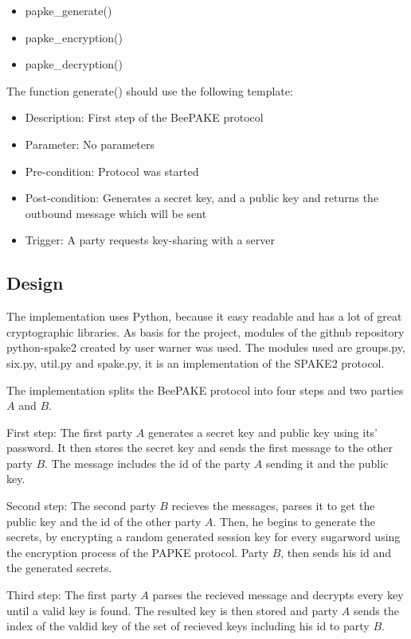 \documentclass[../main.tex]{subfiles}
\begin{document}
\begin{itemize}
	\item papke\_generate()
	\item papke\_encryption()
	\item papke\_decryption()
\end{itemize}

The function generate() should use the following template:
\begin{itemize}
	\item Description: First step of the BeePAKE protocol
	\item Parameter: No parameters
	\item Pre-condition: Protocol was started
	\item Post-condition: Generates a secret key, and a public key and returns the outbound message which will be sent
	\item Trigger: A party requests key-sharing with a server
\end{itemize}

\subsection{Design} 
The implementation uses Python, because it easy readable and has a lot of great
cryptographic libraries. As basis for the project, modules of the github
repository python-spake2 created by user warner \cite{warner2016} was used. The
modules used are groups.py, six.py, util.py and spake.py, it is an
implementation of the SPAKE2 protocol. 

The implementation splits the BeePAKE protocol into four steps and two parties
\(A\) and \(B\).

First step: The first party \(A\) generates a secret key and public key using its'
password. It then stores the secret key and sends the first message to the
other party \(B\). The message includes the id of the party \(A\) sending it and the public
key.

Second step: The second party \(B\) recieves the messages, parses it to get the
public key and the id of the other party \(A\). Then, he begins to generate the
secrets, by encrypting a random generated session key for every sugarword using
the encryption process of the PAPKE protocol. Party \(B\), then sends his id
and the generated secrets.

Third step: The first party \(A\) parses the recieved message and decrypts
every key until a valid key is found. The resulted key is then stored and party
\(A\) sends the index of the valdid key of the set of recieved keys including
his id to party \(B\). 
\end{document}
